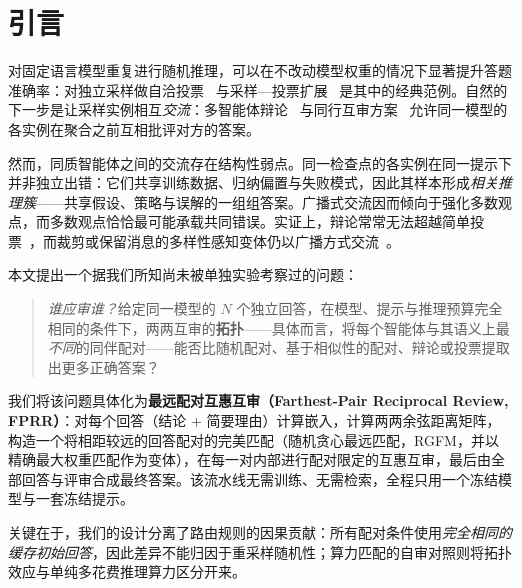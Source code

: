 \documentclass[UTF8,11pt]{ctexart}
\begin{document}
\section{引言}
\label{sec:intro}

对固定语言模型重复进行随机推理，可以在不改动模型权重的情况下显著提升答题准确率：对独立采样做自洽投票~\cite{wang2022selfconsistency} 与采样—投票扩展~\cite{li2024moreagents} 是其中的经典范例。自然的下一步是让采样实例相互\emph{交流}：多智能体辩论~\cite{du2023multiagent} 与同行互审方案~\cite{xu2023peerreview} 允许同一模型的各实例在聚合之前互相批评对方的答案。

然而，同质智能体之间的交流存在结构性弱点。同一检查点的各实例在同一提示下并非独立出错：它们共享训练数据、归纳偏置与失败模式，因此其样本形成\emph{相关推理簇}——共享假设、策略与误解的一组组答案。广播式交流因而倾向于强化多数观点，而多数观点恰恰最可能承载共同错误。实证上，辩论常常无法超越简单投票~\cite{yang2025revisiting,choi2025debateorvote}，而裁剪或保留消息的多样性感知变体仍以广播方式交流~\cite{estornell2024multillm,nguyen2026dars}。

本文提出一个据我们所知尚未被单独实验考察过的问题：

\begin{quote}
\emph{谁应审谁？}给定同一模型的 $N$ 个独立回答，在模型、提示与推理预算完全相同的条件下，两两互审的\textbf{拓扑}——具体而言，将每个智能体与其语义上最\emph{不同}的同伴配对——能否比随机配对、基于相似性的配对、辩论或投票提取出更多正确答案？
\end{quote}

我们将该问题具体化为\textbf{最远配对互惠互审（Farthest-Pair Reciprocal Review, FPRR）}：对每个回答（结论 + 简要理由）计算嵌入，计算两两余弦距离矩阵，构造一个将相距较远的回答配对的完美匹配（随机贪心最远匹配，RGFM，并以精确最大权重匹配作为变体），在每一对内部进行配对限定的互惠互审，最后由全部回答与评审合成最终答案。该流水线无需训练、无需检索，全程只用一个冻结模型与一套冻结提示。

关键在于，我们的设计分离了路由规则的因果贡献：所有配对条件使用\emph{完全相同的缓存初始回答}，因此差异不能归因于重采样随机性；算力匹配的自审对照则将拓扑效应与单纯多花费推理算力区分开来。
\end{document}
